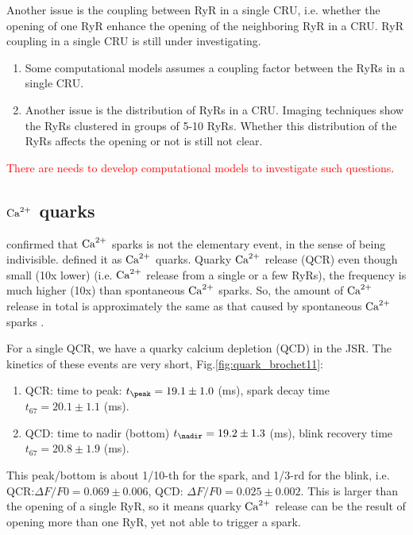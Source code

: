 Another issue is the coupling between RyR in a single CRU,
i.e. whether the opening of one RyR enhance the opening of the
neighboring RyR in a CRU. RyR coupling in a single CRU is still under
investigating. 
\begin{enumerate}
\item Some computational models assumes a coupling factor
  between the RyRs in a single CRU. 
\item Another issue is the distribution of RyRs in a CRU.  Imaging
  techniques show the RyRs clustered in groups of 5-10 RyRs. Whether
  this distribution of the RyRs affects the opening or not is still
  not clear.
\end{enumerate}
\textcolor{red}{There are needs to develop computational models to
  investigate such questions}.




\subsection{${\text{Ca}^{2+}}$ quarks}
\label{sec:calcium_quarks}

\citep{parker1996csi} confirmed that ${\text{Ca}^{2+}}$ sparks is not the elementary event,
in the sense of being indivisible. \citep{lipp1996} defined it as ${\text{Ca}^{2+}}$ quarks.
Quarky ${\text{Ca}^{2+}}$ release (QCR) even though small (10x lower) (i.e.
${\text{Ca}^{2+}}$ release from a single or a few RyRs), the frequency is much higher (10x)
than spontaneous ${\text{Ca}^{2+}}$  sparks.
So, the amount of ${\text{Ca}^{2+}}$ release in total is approximately the same as that
caused by spontaneous ${\text{Ca}^{2+}}$ sparks \citep{brochet2011}.

For a single QCR, we have a quarky calcium depletion (QCD) in the JSR. The
kinetics of these events are very short, Fig.\ref{fig:quark_brochet11}:
\begin{enumerate}
  \item QCR: time to peak: $t_\peak=19.1\pm 1.0$ (ms), spark decay time
  $t_{67}=20.1\pm 1.1$ (ms).
  
  \item QCD: time to nadir (bottom) $t_\nadir=19.2\pm 1.3$ (ms), blink recovery
  time $t_{67} = 20.8\pm 1.9$ (ms).
\end{enumerate}
This peak/bottom is about 1/10-th for the spark, and 1/3-rd for the blink, i.e.
QCR:$\Delta F/F0=0.069\pm 0.006$, QCD: $\Delta F/F0=0.025\pm0.002$. This is
larger than the opening of a single RyR, so it means quarky ${\text{Ca}^{2+}}$ release can be
the result of opening more than one RyR, yet not able to trigger a spark. 

